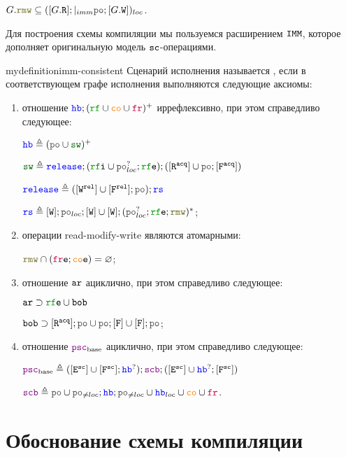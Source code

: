 $G.\lRMW \subseteq ([G.\lR] ;\imm \lPO;[G.\lW])_{loc}$. 

Для построения схемы компиляции мы пользуемся расширением \cite{imm-sc} $\mathtt{IMM}$, которое дополняет оригинальную модель \cite{imm} ${\mathtt{sc}}$-операциями. 

\begin{restatable}{mydefinition}{imm-consistent}
  Сценарий исполнения называется , если в соответствующем графе исполнения выполняются следующие аксиомы:
  \begin{enumerate}
  \item отношение $\lHB ; (\lRF \cup \lCO \cup \lFR)^{+}$ иррефлексивно, при этом справедливо следующее:
    
  $\lHB \defeq (\lPO \cup \lSW)^{+}$

  $\lSW \defeq \mathtt{\color{blue}release};(\lRFI \cup \lPO^?_{loc};\lRFE);([\lR^{\acq}] \cup \lPO;[\lF^{\acq}])$

  $\mathtt{\color{blue}release} \defeq ([\lW^{\rel}] \cup [\lF^{\rel}];\lPO);\mathtt{\color{blue}rs}$

  $\mathtt{\color{blue}rs} \defeq [\lW];\lPO_{loc};[\lW] \cup [\lW];(\lPO^?_{loc};\lRFE;\lRMW)^{*}$;
\item операции read-modify-write являются атомарными:

  $\lRMW \cap (\lFRE ; \lCOE) = \emptyset$;
  \item отношение $\lAR$ ациклично, при этом справедливо следующее:

    $\lAR \supset \lRFE \cup \lBOB$

    $\lBOB \supset [\lR^{\acq}] ; \lPO \cup \lPO ; [\lF] \cup [\lF] ; \lPO$;
  \item отношение $\lPSCB$ ациклично, при этом справедливо следующее:

    $\lPSCB \defeq ([\lE^\sco] \cup{} [\lF^\sco];\lHB^?);\lSCB;([\lE^\sco] \cup{} \lHB^?;[\lF^\sco])$

    $\lSCB \defeq \lPO \cup \lPO_{\neq loc} ; \lHB ; \lPO_{\neq loc} \cup \lHB_{loc} \cup \lCO \cup \lFR$.

  \end{enumerate}
\end{restatable}


\section{Обоснование схемы компиляции}
\label{compilation-scheme}

